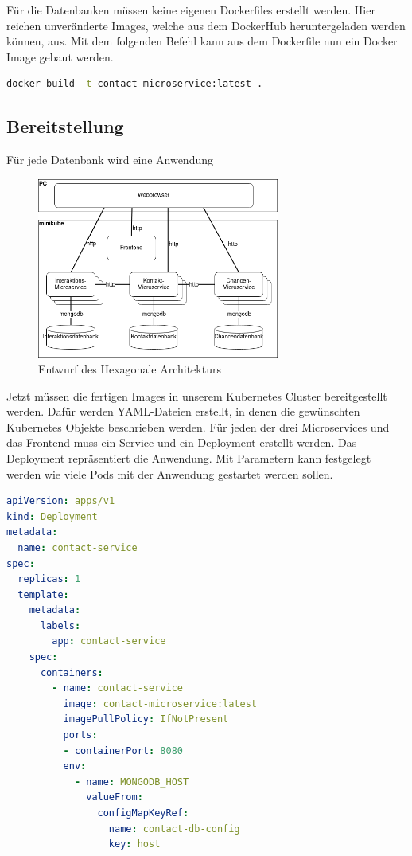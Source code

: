Für die Datenbanken müssen keine eigenen Dockerfiles erstellt werden. Hier reichen unveränderte Images, welche aus dem DockerHub heruntergeladen werden können, aus. Mit dem folgenden Befehl kann aus dem Dockerfile nun ein Docker Image gebaut werden.

\begin{lstlisting}[language=bash, caption=Befehl , captionpos=b]
docker build -t contact-microservice:latest .
\end{lstlisting}


\subsection{Bereitstellung}

Für jede Datenbank wird eine Anwendung 

\begin{figure}[H] 
    \centering
    \includegraphics[width=0.71\textwidth]{figures/DeploymentDiagramm.png}
    \caption{Entwurf des \acp{Hexagonale Architektur}}
    \label{fig:CRMENTWURF}
\end{figure}

Jetzt müssen die fertigen Images in unserem Kubernetes Cluster bereitgestellt werden. Dafür werden YAML-Dateien erstellt, in denen die gewünschten Kubernetes Objekte beschrieben werden. Für jeden der drei Microservices und das Frontend muss ein Service und ein Deployment erstellt werden. Das Deployment repräsentiert die Anwendung. Mit Parametern kann festgelegt werden wie viele Pods mit der Anwendung gestartet werden sollen.

\begin{lstlisting}[language=YAML, caption=Befehl]
apiVersion: apps/v1
kind: Deployment
metadata:
  name: contact-service
spec:
  replicas: 1
  template:
    metadata:
      labels:
        app: contact-service
    spec:
      containers:
        - name: contact-service
          image: contact-microservice:latest
          imagePullPolicy: IfNotPresent
          ports:
          - containerPort: 8080
          env:
            - name: MONGODB_HOST
              valueFrom:
                configMapKeyRef:
                  name: contact-db-config  
                  key: host
\end{lstlisting}

